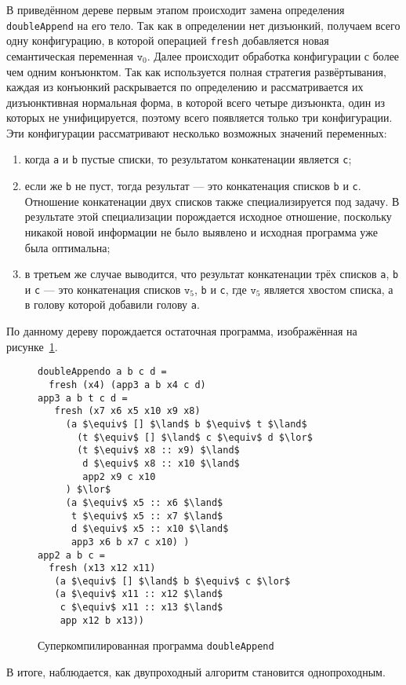 В приведённом дереве первым этапом происходит замена определения \lstinline{doubleAppend}
на его тело. Так как в определении нет дизъюнкий, получаем всего одну конфигурацию,
в которой операцией \lstinline{fresh} добавляется новая семантическая переменная $\texttt{v}_0$.
Далее происходит обработка конфигурации с более чем одним конъюнктом. Так как используется
полная стратегия развёртывания, каждая из конъюнкий раскрывается по определению и
рассматривается их дизъюнктивная нормальная форма, в которой всего четыре дизъюнкта,
один из которых не унифицируется, поэтому всего появляется только три конфигурации.
Эти конфигурации рассматривают несколько возможных значений переменных:
\begin{enumerate}
\item когда \lstinline{a} и \lstinline{b} пустые списки, то результатом конкатенации
является \lstinline{c};
\item если же \lstinline{b} не пуст, тогда результат --- это конкатенация списков \lstinline{b} и \lstinline{c}.
      Отношение конкатенации двух списков также специализируется под задачу.
      В результате этой специализации порождается исходное отношение, поскольку
      никакой новой информации не было выявлено и исходная программа уже была оптимальна;
\item в третьем же случае выводится, что результат конкатенации трёх списков
      \lstinline{a}, \lstinline{b} и \lstinline{c} --- это конкатенация
      списков $\texttt{v}_5$, \lstinline{b} и \lstinline{c}, где $\texttt{v}_5$
      является хвостом списка, а в голову которой добавили голову \lstinline{a}.
\end{enumerate}

По данному дереву порождается остаточная программа, изображённая на рисунке~\ref{fig:dappCodeOpt}.
\begin{figure}[h!]
\begin{lstlisting}
doubleAppendo a b c d =
  fresh (x4) (app3 a b x4 c d)
app3 a b t c d =
   fresh (x7 x6 x5 x10 x9 x8)
     (a $\equiv$ [] $\land$ b $\equiv$ t $\land$
       (t $\equiv$ [] $\land$ c $\equiv$ d $\lor$
       (t $\equiv$ x8 :: x9) $\land$
        d $\equiv$ x8 :: x10 $\land$
        app2 x9 c x10
     ) $\lor$
     (a $\equiv$ x5 :: x6 $\land$
      t $\equiv$ x5 :: x7 $\land$
      d $\equiv$ x5 :: x10 $\land$
      app3 x6 b x7 c x10) ) 
app2 a b c =
  fresh (x13 x12 x11)
   (a $\equiv$ [] $\land$ b $\equiv$ c $\lor$
   (a $\equiv$ x11 :: x12 $\land$
    c $\equiv$ x11 :: x13 $\land$
    app x12 b x13))
\end{lstlisting}
\caption{Суперкомпилированная программа \lstinline{doubleAppend}}
\label{fig:dappCodeOpt}
\end{figure}

В итоге, наблюдается, как двупроходный алгоритм становится однопроходным.
